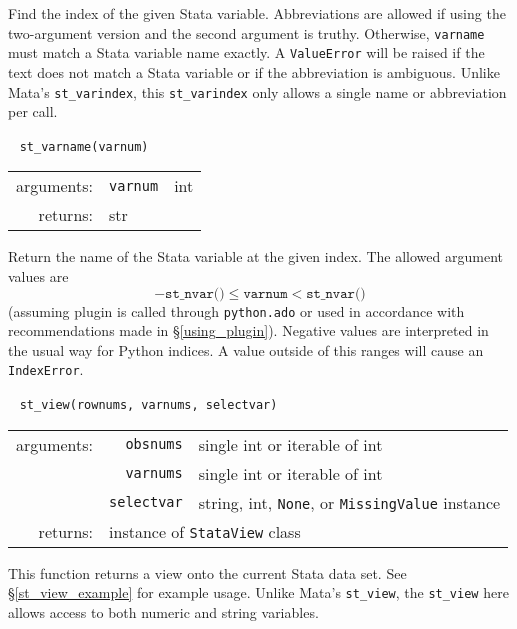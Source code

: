 \documentclass{article}
\begin{document}
			\vspace{1.5mm}
			\noindent Find the index of the given Stata variable. Abbreviations are allowed if using the two-argument version and the second argument is truthy. Otherwise, \lstinline{varname} must match a Stata variable name exactly. A \lstinline$ValueError$ will be raised if the text does not match a Stata variable or if the abbreviation is ambiguous. Unlike Mata's \lstinline{st_varindex}, this \lstinline{st_varindex} only allows a single name or abbreviation per call. \newline
			
			
			\ \newline
			\noindent \lstinline$st_varname(varnum)$
								
			\vspace{1.5mm}
			\noindent 
			\indent \begin{tabular}{rrl}
					arguments: & \texttt{varnum} & int \\
					returns: & \multicolumn{2}{l}{str}
				\end{tabular}
								
			\vspace{1.5mm}
			\noindent Return the name of the Stata variable at the given index. The allowed argument values are
			\[
				-\texttt{st\_nvar()} \leq \texttt{varnum} < \texttt{st\_nvar()}
			\]
			(assuming plugin is called through \lstinline$python.ado$ or used in accordance with recommendations made in \S\ref{using_plugin}). Negative values are interpreted in the usual way for Python indices. A value outside of this ranges will cause an \lstinline$IndexError$. \newline
			
			
			\ \newline
			\noindent \lstinline$st_view(rownums, varnums, selectvar)$
								
			\vspace{1.5mm}
			\noindent
			\indent \begin{tabular}{rrl}
					arguments: & \texttt{obsnums} & single int or iterable of int \\
						& \texttt{varnums} & single int or iterable of int \\
						& \texttt{selectvar} & string, int, \lstinline$None$, or \lstinline$MissingValue$ instance \\
					returns: & \multicolumn{2}{l}{instance of \lstinline$StataView$ class}
				\end{tabular}
								
			\vspace{1.5mm}
			\noindent This function returns a view onto the current Stata data set. See \S\ref{st_view_example} for example usage. Unlike Mata's \lstinline{st_view}, the \lstinline{st_view} here allows access to both numeric and string variables. 
			
\end{document}
